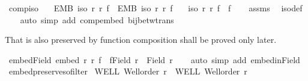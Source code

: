 \begin{isabellebody}
%
\isadelimproof
\isanewline
%
\endisadelimproof
\isanewline
{}\isamarkupfalse%
\ comp{\isacharunderscore}{\kern0pt}iso{\isacharcolon}{\kern0pt}\isanewline
\ \ \ EMB{\isacharcolon}{\kern0pt}\ {\isachardoublequoteopen}iso\ r\ r{\isacharprime}{\kern0pt}\ f{\isachardoublequoteclose}\ \ EMB{\isacharprime}{\kern0pt}{\isacharcolon}{\kern0pt}\ {\isachardoublequoteopen}iso\ r{\isacharprime}{\kern0pt}\ r{\isacharprime}{\kern0pt}{\isacharprime}{\kern0pt}\ f{\isacharprime}{\kern0pt}{\isachardoublequoteclose}\isanewline
\ \ \ {\isachardoublequoteopen}iso\ r\ r{\isacharprime}{\kern0pt}{\isacharprime}{\kern0pt}\ {\isacharparenleft}{\kern0pt}f{\isacharprime}{\kern0pt}\ {\isasymcirc}\ f{\isacharparenright}{\kern0pt}{\isachardoublequoteclose}\isanewline
%
\isadelimproof
\ \ %
\endisadelimproof
%
\isatagproof
{}\isamarkupfalse%
\ assms\ \isamarkupfalse%
\ iso{\isacharunderscore}{\kern0pt}def\isanewline
\ \ \isamarkupfalse%
\ {\isacharparenleft}{\kern0pt}auto\ simp\ add{\isacharcolon}{\kern0pt}\ comp{\isacharunderscore}{\kern0pt}embed\ bij{\isacharunderscore}{\kern0pt}betw{\isacharunderscore}{\kern0pt}trans{\isacharparenright}{\kern0pt}%
\endisatagproof
{\isafoldproof}%
%
\isadelimproof
%
\endisadelimproof
%
\begin{isamarkuptext}%
That  is also preserved by function composition shall be proved only later.%
\end{isamarkuptext}\isamarkuptrue%
\isamarkupfalse%
\ embed{\isacharunderscore}{\kern0pt}Field{\isacharcolon}{\kern0pt}\ {\isachardoublequoteopen}embed\ r\ r{\isacharprime}{\kern0pt}\ f\ {\isasymLongrightarrow}\ f{\isacharbackquote}{\kern0pt}{\isacharparenleft}{\kern0pt}Field\ r{\isacharparenright}{\kern0pt}\ {\isasymle}\ Field\ r{\isacharprime}{\kern0pt}{\isachardoublequoteclose}\isanewline
%
\isadelimproof
\ \ %
\endisadelimproof
%
\isatagproof
{}\isamarkupfalse%
\ {\isacharparenleft}{\kern0pt}auto\ simp\ add{\isacharcolon}{\kern0pt}\ embed{\isacharunderscore}{\kern0pt}in{\isacharunderscore}{\kern0pt}Field{\isacharparenright}{\kern0pt}%
\endisatagproof
{\isafoldproof}%
%
\isadelimproof
\isanewline
%
\endisadelimproof
\isanewline
{}\isamarkupfalse%
\ embed{\isacharunderscore}{\kern0pt}preserves{\isacharunderscore}{\kern0pt}ofilter{\isacharcolon}{\kern0pt}\isanewline
{}\ WELL{\isacharcolon}{\kern0pt}\ {\isachardoublequoteopen}Well{\isacharunderscore}{\kern0pt}order\ r{\isachardoublequoteclose}\ \ WELL{\isacharprime}{\kern0pt}{\isacharcolon}{\kern0pt}\ {\isachardoublequoteopen}Well{\isacharunderscore}{\kern0pt}order\ r{\isacharprime}{\kern0pt}{\isachardoublequoteclose}\ \isanewline

\end{isabellebody}
